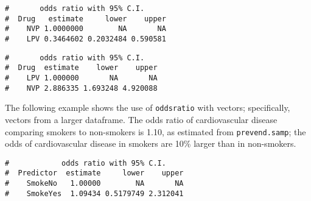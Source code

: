 \documentclass[letterpaper,12pt,twoside,]{pinp}
\begin{document}
\begin{ShadedResult}
\begin{verbatim}
#       odds ratio with 95% C.I.
#  Drug   estimate     lower    upper
#    NVP 1.0000000        NA       NA
#    LPV 0.3464602 0.2032484 0.590581
\end{verbatim}
\end{ShadedResult}

\begin{Shaded}
\begin{Highlighting}[]
 \NormalTok{, } \NormalTok{)}\OperatorTok{$}
\end{Highlighting}
\end{Shaded}

\begin{ShadedResult}
\begin{verbatim}
#       odds ratio with 95% C.I.
#  Drug  estimate    lower    upper
#    LPV 1.000000       NA       NA
#    NVP 2.886335 1.693248 4.920088
\end{verbatim}
\end{ShadedResult}

The following example shows the use of \texttt{oddsratio} with vectors;
specifically, vectors from a larger dataframe. The odds ratio of
cardiovascular disease comparing smokers to non-smokers is 1.10, as
estimated from \texttt{prevend.samp}; the odds of cardiovascular disease
in smokers are 10\% larger than in non-smokers.

\begin{Shaded}
\begin{Highlighting}[]
\OperatorTok{$}\OperatorTok{$} \NormalTok{)}\OperatorTok{$}
\end{Highlighting}
\end{Shaded}

\begin{ShadedResult}
\begin{verbatim}
#            odds ratio with 95% C.I.
#  Predictor  estimate     lower    upper
#    SmokeNo   1.00000        NA       NA
#    SmokeYes  1.09434 0.5179749 2.312041
\end{verbatim}
\end{ShadedResult}
\end{document}
